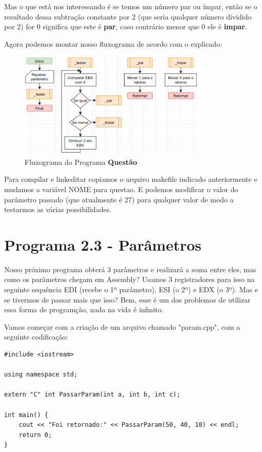 Mas o que está nos interessando é se temos um número par ou ímpar, então se o resultado dessa subtração constante por 2 (que seria qualquer número dividido por 2) for 0 significa que este é \textbf{par}, caso contrário menor que 0 ele é \textbf{impar}.

Agora podemos montar nosso fluxograma de acordo com o explicado:
\begin{figure}[H]
	\centering
	\includegraphics[width=0.8\textwidth]{Pictures/cap02/programa22}
	\caption{Fluxograma do Programa \textbf{Questão}}
\end{figure}

Para compilar e linkeditar copiamos o arquivo makefile indicado anteriormente e mudamos a variável NOME para questao. E podemos modificar o valor do parâmetro passado (que atualmente é 27) para qualquer valor de modo a testarmos as várias possibilidades.

\section{Programa 2.3 - Parâmetros}
Nosso próximo programa obterá 3 parâmetros e realizará a soma entre eles, mas como os parâmetros chegam em Assembly? Usamos 3 registradores para isso na seguinte sequência EDI (recebe o 1º parâmetro), ESI (o 2º) e EDX (o 3º). Mas e se tivermos de passar mais que isso? Bem, esse é um dos problemas de utilizar essa forma de programção, nada na vida é infinito.

Vamos começar com a criação de um arquivo chamado "param.cpp", com a seguinte codificação:
\begin{lstlisting}[]
#include <iostream>

using namespace std;

extern "C" int PassarParam(int a, int b, int c);

int main() {
	cout << "Foi retornado:" << PassarParam(50, 40, 10) << endl;
	return 0;
}
\end{lstlisting}

